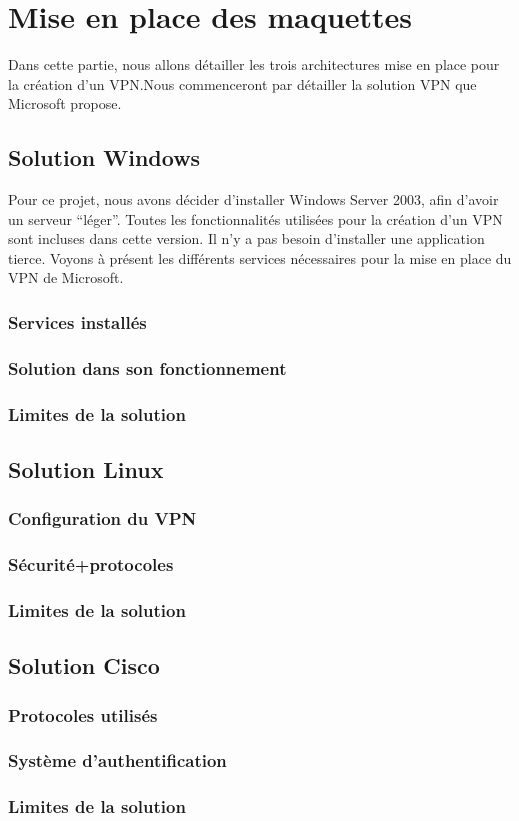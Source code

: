 \section{Mise en place des maquettes}

	Dans cette partie, nous allons détailler les trois architectures mise en place pour la création d'un VPN.Nous commenceront par détailler la solution VPN que Microsoft propose.

\subsection{Solution Windows}

	Pour ce projet, nous avons décider d'installer Windows Server 2003, afin d'avoir un serveur ``léger''. Toutes les fonctionnalités utilisées pour la création d'un VPN sont incluses dans cette version. Il n'y a pas besoin d'installer une application tierce.
	Voyons à présent les différents services nécessaires pour la mise en place du VPN de Microsoft.

\subsubsection{Services installés}

	
\subsubsection{Solution dans son fonctionnement}
\subsubsection{Limites de la solution}

\subsection{Solution Linux}
\subsubsection{Configuration du VPN}
\subsubsection{Sécurité+protocoles}
\subsubsection{Limites de la solution}

\subsection{Solution Cisco}
\subsubsection{Protocoles utilisés}
\subsubsection{Système d'authentification}
\subsubsection{Limites de la solution}

\pagebreak
